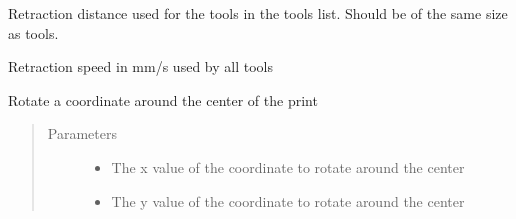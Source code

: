 \documentclass[letterpaper,10pt,english]{sphinxmanual}
\begin{document}
\begin{fulllineitems}
\begin{fulllineitems}
\begin{quote}
\begin{description}
\end{description}\end{quote}

\end{fulllineitems}


\begin{fulllineitems}
\label{\detokenize{index:generator.generator.retraction_distance}}
\sphinxAtStartPar
Retraction distance used for the tools in the tools list. Should be of the same size as tools.

\end{fulllineitems}


\begin{fulllineitems}
\label{\detokenize{index:generator.generator.retraction_speed}}
\sphinxAtStartPar
Retraction speed in mm/s used by all tools

\end{fulllineitems}


\begin{fulllineitems}
\label{\detokenize{index:generator.generator.rotate}}
\sphinxAtStartPar
Rotate a coordinate around the center of the print
\begin{quote}\begin{description}
\item[{Parameters}] \leavevmode\begin{itemize}
\item {} 
\sphinxAtStartPar
{} \textendash{} The x value of the coordinate to rotate around the center

\item {} 
\sphinxAtStartPar
{} \textendash{} The y value of the coordinate to rotate around the center


\end{itemize}
\end{description}
\end{quote}
\end{fulllineitems}
\end{fulllineitems}
\end{document}
